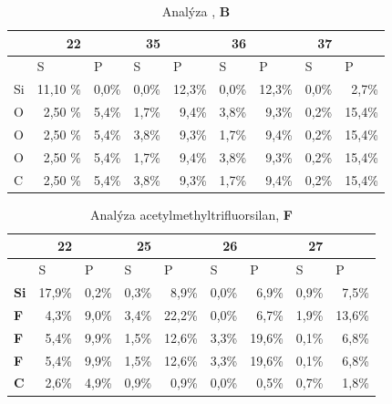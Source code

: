 \documentclass[
  digital, %
  table,   %
  lof,     %
  lot,     %
  oneside,
]{fithesis3}
\begin{document}
\begin{table}[htbp]
\caption{Analýza , \textbf{B}}
\begin{center}
\begin{tabular}{|l|r|r|r|r|r|r|r|r|}
\hline
& 22 & \multicolumn{1}{l|}{} & 35 & \multicolumn{1}{l|}{} & 36 & \multicolumn{1}{l|}{} & 37 & \multicolumn{1}{l|}{} \\ \hline
 & \multicolumn{1}{l|}{S} & \multicolumn{1}{l|}{P} & \multicolumn{1}{l|}{S} & \multicolumn{1}{l|}{P} & \multicolumn{1}{l|}{S} & \multicolumn{1}{l|}{P} & \multicolumn{1}{l|}{S} & \multicolumn{1}{l|}{P} \\ \hline
Si & 11,10 \% & 0,0\% & 0,0\% & 12,3\% & 0,0\% & 12,3\% & 0,0\% & 2,7\% \\ \hline
O & 2,50 \% & 5,4\% & 1,7\% & 9,4\% & 3,8\% & 9,3\% & 0,2\% & 15,4\% \\ \hline
O & 2,50 \% & 5,4\% & 3,8\% & 9,3\% & 1,7\% & 9,4\% & 0,2\% & 15,4\% \\ \hline
O & 2,50 \% & 5,4\% & 1,7\% & 9,4\% & 3,8\% & 9,3\% & 0,2\% & 15,4\% \\ \hline
C & 2,50 \% & 5,4\% & 3,8\% & 9,3\% & 1,7\% & 9,4\% & 0,2\% & 15,4\% \\ \hline
\end{tabular}
\end{center}
\label{si_och3_4_MPA}
\end{table}

\begin{table}[htbp]
\caption{Analýza acetylmethyltrifluorsilan, \textbf{F}}
\begin{center}
\begin{tabular}{|l|r|r|r|r|r|r|r|r|}
\hline
& 22 & \multicolumn{1}{l|}{} & 25 & \multicolumn{1}{l|}{} & 26 & \multicolumn{1}{l|}{} & 27 & \multicolumn{1}{l|}{} \\ \hline
 & \multicolumn{1}{l|}{S} & \multicolumn{1}{l|}{P} & \multicolumn{1}{l|}{S} & \multicolumn{1}{l|}{P} & \multicolumn{1}{l|}{S} & \multicolumn{1}{l|}{P} & \multicolumn{1}{l|}{S} & \multicolumn{1}{l|}{P} \\ \hline\textbf{Si} & 17,9\% & 0,2\% & 0,3\% & 8,9\% & 0,0\% & 6,9\% & 0,9\% & 7,5\% \\ \hline
\textbf{F} & 4,3\% & 9,0\% & 3,4\% & 22,2\% & 0,0\% & 6,7\% & 1,9\% & 13,6\% \\ \hline
\textbf{F} & 5,4\% & 9,9\% & 1,5\% & 12,6\% & 3,3\% & 19,6\% & 0,1\% & 6,8\% \\ \hline
\textbf{F} & 5,4\% & 9,9\% & 1,5\% & 12,6\% & 3,3\% & 19,6\% & 0,1\% & 6,8\% \\ \hline
\textbf{C} & 2,6\% & 4,9\% & 0,9\% & 0,9\% & 0,0\% & 0,5\% & 0,7\% & 1,8\% \\ \hline
\end{tabular}
\end{center}
\label{acetylmethyltrifluorsilan_MPA}
\end{table}
\end{document}
